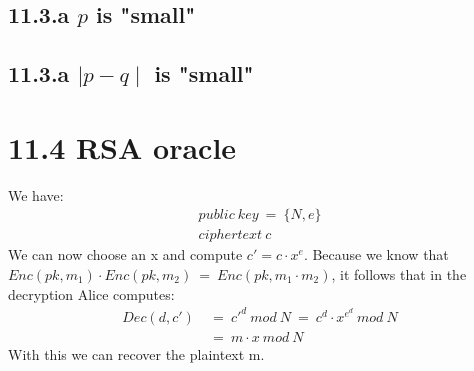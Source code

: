 \documentclass{report}
\begin{document}
	\subsection*{11.3.a $p$ is "small"}
	\subsection*{11.3.a $\mid p - q \mid$ is "small"}
	\section*{11.4 RSA oracle}
		We have:
		\begin{align*}
			public \ key \ = \ \{ N,e \} \\
			ciphertext \ c
		\end{align*}
		We can now choose an x and compute $c' = c \cdot x^e$. Because we know that $Enc(pk, m_1) \cdot Enc(pk, m_2) \ = \ Enc(pk, m_1 \cdot m_2)$, it follows that in the decryption Alice computes:
		\begin{align*}
			Dec(d, c') \ & = \ c'^d \ mod \ N \ = \ c^d \cdot x^{e^d} \ mod \ N \\
			& = \ m \cdot x \ mod \ N
		\end{align*}
		With this we can recover the plaintext m.
\end{document}
